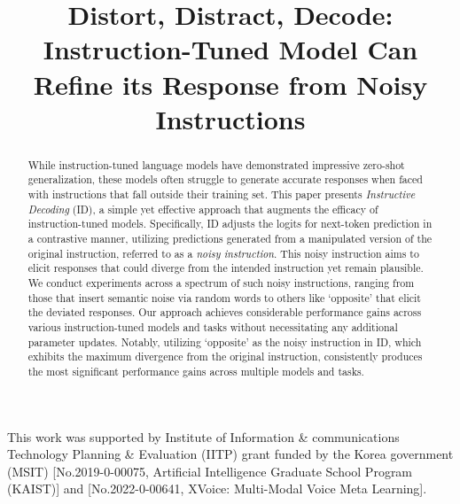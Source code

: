 \documentclass{article} %
\title{Distort, Distract, Decode: Instruction-Tuned Model Can Refine its Response from Noisy Instructions}
\begin{document}
\maketitle

\begin{abstract}
While instruction-tuned language models have demonstrated impressive zero-shot generalization,
these models often struggle to generate accurate responses when faced with instructions that fall outside their training set. This paper presents \textit{Instructive Decoding} (ID), a simple yet effective approach that augments the efficacy of instruction-tuned models. Specifically, ID adjusts the logits for next-token prediction in a contrastive manner, utilizing predictions generated from a manipulated version of the original instruction, referred to as a \textit{noisy instruction}. This noisy instruction aims to elicit responses that could diverge from the intended instruction yet remain plausible. We conduct experiments across a spectrum of such noisy instructions, ranging from those that insert semantic noise via random words to others like `opposite' that elicit the deviated responses. 
Our approach achieves considerable performance gains across various instruction-tuned models and tasks without necessitating any additional parameter updates. Notably, utilizing `opposite' as the noisy instruction in ID, which exhibits the maximum divergence from the original instruction, consistently produces the most significant performance gains across multiple models and tasks.
\end{abstract}











\begin{ack}
This work was supported by Institute of Information \& communications Technology Planning \& Evaluation (IITP) grant funded by the Korea government (MSIT) [No.2019-0-00075, Artificial Intelligence Graduate School Program (KAIST)] and [No.2022-0-00641, XVoice: Multi-Modal Voice Meta Learning].
\end{ack}





\end{document}

